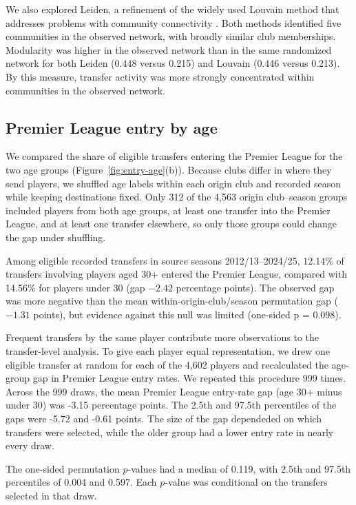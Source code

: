 We also explored Leiden, a refinement of the widely used Louvain method that addresses problems with community connectivity \cite{traag2019leiden}. Both methods identified five communities in the observed network, with broadly similar club memberships. Modularity was higher in the observed network than in the same randomized network for both Leiden (0.448 versus 0.215) and Louvain (0.446 versus 0.213). By this measure, transfer activity was more strongly concentrated within communities in the observed network.

\subsection*{Premier League entry by age}

We compared the share of eligible transfers entering the Premier League for the two age groups (Figure~\ref{fig:entry-age}(b)). Because clubs differ in where they send players, we shuffled age labels within each origin club and recorded season while keeping destinations fixed. Only 312 of the 4,563 origin club--season groups included players from both age groups, at least one transfer into the Premier League, and at least one transfer elsewhere, so only those groups could change the gap under shuffling.

Among eligible recorded transfers in source seasons 2012/13--2024/25, 12.14\% of transfers involving players aged 30+ entered the Premier League, compared with 14.56\% for players under 30 (gap $-2.42$ percentage points). The observed gap was more negative than the mean within-origin-club/season permutation gap ($-1.31$ points), but evidence against this null was limited (one-sided p = 0.098).

Frequent transfers by the same player contribute more observations to the transfer-level analysis. To give each player equal representation, we drew one eligible transfer at random for each of the 4,602 players and recalculated the age-group gap in Premier League entry rates. We repeated this procedure 999 times. Across the 999 draws, the mean Premier League entry-rate gap (age 30+ minus under 30) was -3.15 percentage points. The 2.5th and 97.5th percentiles of the gaps were -5.72 and -0.61 points. The size of the gap dependeded on which transfers were selected, while the older group had a lower entry rate in nearly every draw.

The one-sided permutation $p$-values had a median of 0.119, with 2.5th and 97.5th percentiles of 0.004 and 0.597. Each $p$-value was conditional on the transfers selected in that draw.

